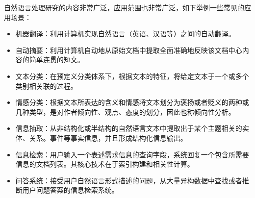 自然语言处理研究的内容非常广泛，应用范围也非常广泛，如下举例一些常见的应用场景：
\begin{itemize}
\item 机器翻译：利用计算机实现自然语言（英语、汉语等）之间的自动翻译。
\item 自动摘要：利用计算机自动地从原始文档中提取全面准确地反映该文档中心内容的简单连贯的短文。
\item 文本分类：在预定义分类体系下，根据文本的特征，将给定文本于一个或多个类别相关联的过程。
\item 情感分类：根据文本所表达的含义和情感将文本划分为褒扬或者贬义的两种或几种类型，是对作者倾向性、观点、态度的划分，因此也称倾向性分析。
\item 信息抽取：从非结构化或半结构的自然语言文本中提取出于某个主题相关的实体、关系。事件等事实信息，并且形成结构化信息输出。
\item 信息检索：用户输入一个表述需求信息的查询字段，系统回复一个包含所需要信息的文档列表。其核心技术在于索引构建和相关性计算。
\item 问答系统：接受用户自然语言形式描述的问题，从大量异构数据中查找或者推断用户问题答案的信息检索系统。
\end{itemize}


